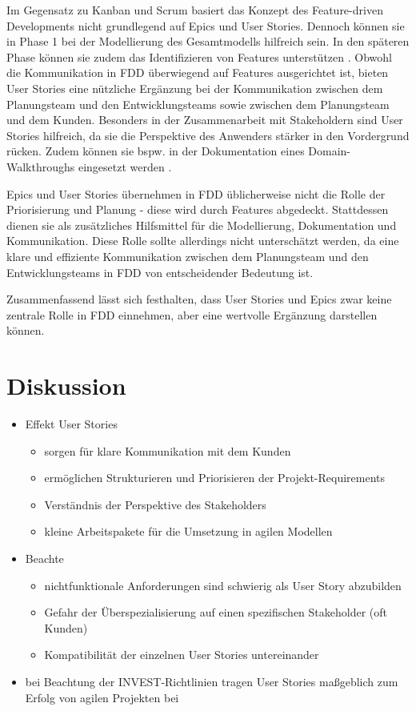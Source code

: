 \documentclass[acmtog]{acmart}
\begin{document}
Im Gegensatz zu Kanban und Scrum basiert das Konzept des Feature-driven Developments nicht grundlegend auf Epics und User Stories.
Dennoch können sie in Phase 1 bei der Modellierung des Gesamtmodells hilfreich sein.
In den späteren Phase können sie zudem das Identifizieren von Features unterstützen \cite{hunt06}.
Obwohl die Kommunikation in FDD überwiegend auf Features ausgerichtet ist, bieten User Stories eine nützliche Ergänzung bei der Kommunikation zwischen dem Planungsteam und den Entwicklungsteams sowie zwischen dem Planungsteam und dem Kunden.
Besonders in der Zusammenarbeit mit Stakeholdern sind User Stories hilfreich, da sie die Perspektive des Anwenders stärker in den Vordergrund rücken.
Zudem können sie bspw. in der Dokumentation eines Domain-Walkthroughs eingesetzt werden \cite{palmer02}.

Epics und User Stories übernehmen in FDD üblicherweise nicht die Rolle der Priorisierung und Planung - diese wird durch Features abgedeckt. Stattdessen dienen sie als zusätzliches Hilfsmittel für die Modellierung, Dokumentation und Kommunikation. Diese Rolle sollte allerdings nicht unterschätzt werden, da eine klare und effiziente Kommunikation zwischen dem Planungsteam und den Entwicklungsteams in FDD von entscheidender Bedeutung ist.

Zusammenfassend lässt sich festhalten, dass User Stories und Epics zwar keine zentrale Rolle in FDD einnehmen, aber eine wertvolle Ergänzung darstellen können.

\section{Diskussion}

\begin{itemize}
\item Effekt User Stories
  \begin{itemize}
  \item sorgen für klare Kommunikation mit dem Kunden
  \item ermöglichen Strukturieren und Priorisieren der Projekt-Requirements
  \item Verständnis der Perspektive des Stakeholders
  \item kleine Arbeitspakete für die Umsetzung in agilen Modellen
  \end{itemize}
\item Beachte
  \begin{itemize}
  \item nichtfunktionale Anforderungen sind schwierig als User Story abzubilden
  \item Gefahr der Überspezialisierung auf einen spezifischen Stakeholder (oft Kunden)
  \item Kompatibilität der einzelnen User Stories untereinander
  \end{itemize}
\item bei Beachtung der INVEST-Richtlinien tragen User Stories maßgeblich zum Erfolg von agilen Projekten bei
\end{itemize}
\end{document}
